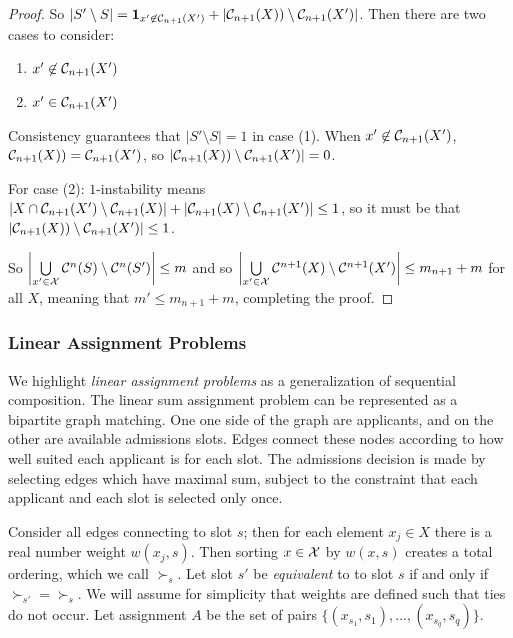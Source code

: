 \begin{proof}
So $|S' \setminus S| = \mathbf{1}_{x'\not\in\mathcal{C}_{n+1}(X')} + |\mathcal{C}_{n+1}(X)) \setminus  \mathcal{C}_{n+1}(X')|$. Then there are two cases to consider:
\begin{enumerate}
    \item $x' \not\in \mathcal{C}_{n+1}(X')$
    \item $x' \in \mathcal{C}_{n+1}(X')$
\end{enumerate}

Consistency guarantees that $|S' \setminus S| = 1$ in case (1). When $x' \not\in \mathcal{C}_{n+1}(X')$, $\mathcal{C}_{n+1}(X)) = \mathcal{C}_{n+1}(X')$, so $|\mathcal{C}_{n+1}(X)) \setminus  \mathcal{C}_{n+1}(X')| = 0$.

For case (2): $1$-instability means $|X \cap \mathcal{C}_{n+1}(X') \setminus \mathcal{C}_{n+1}(X)| + |\mathcal{C}_{n+1}(X) \setminus \mathcal{C}_{n+1}(X')| \leq 1$, so it must be that $|\mathcal{C}_{n+1}(X)) \setminus  \mathcal{C}_{n+1}(X')| \leq 1$.

So $\left| \bigcup\limits_{x'\in\mathcal{X}} \mathcal{C}^n(S)\setminus \mathcal{C}^n(S')\right| \leq m$ and so $\left|\bigcup\limits_{x'\in\mathcal{X}} \mathcal{C}^{n+1}(X) \setminus \mathcal{C}^{n+1}(X') \right| \leq m_{n+1} + m$
for all $X$, meaning that $m' \leq m_{n+1} + m$, completing the proof.
\end{proof}

\subsubsection{Linear Assignment Problems} \label{sec:lap-proofs}

We highlight \textit{linear assignment problems} as a generalization of sequential composition.
The linear sum assignment problem can be represented as a bipartite graph matching.
One one side of the graph are applicants, and on the other are available admissions slots.
Edges connect these nodes according to how well suited each applicant is for each slot.
The admissions decision is made by selecting edges which have maximal sum, subject to the constraint that each applicant and each slot is selected only once.

Consider all edges connecting to slot $s$; then for each element  $x_j \in X$ there is a real number weight $w(x_j, s)$. Then sorting $x \in \mathcal{X}$ by $w(x,s)$ creates a total ordering, which we call $\succ_s$. Let slot $s'$ be \textit{equivalent} to
to slot $s$ if and only if $\succ_{s'} = \succ_{s}$.
We will assume for simplicity that weights are defined such that ties do not occur.
Let assignment $A$ be the set of pairs $\{(x_{s_1}, s_1), ..., (x_{s_q}, s_q)\}$.

